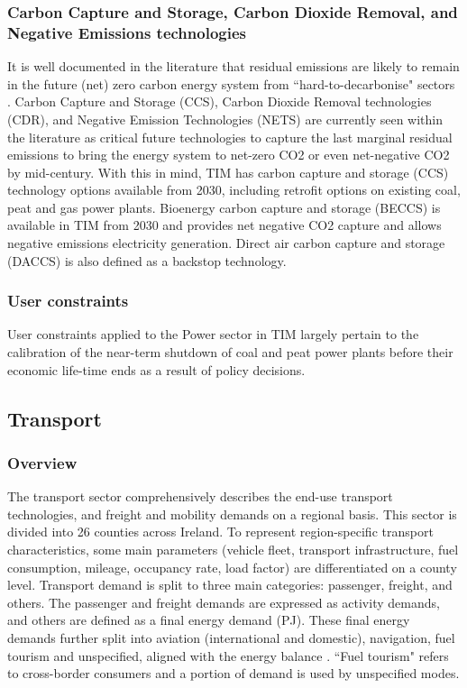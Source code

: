 \documentclass[gmd,manuscript]{copernicus}
\begin{document}
\subsubsection{Carbon Capture and Storage, Carbon Dioxide Removal, and Negative Emissions technologies}
It is well documented in the literature that residual emissions are likely to remain in the future (net) zero carbon energy system from ``hard-to-decarbonise" sectors \citep{Rogelj2018}. Carbon Capture and Storage (CCS), Carbon Dioxide Removal technologies (CDR), and Negative Emission Technologies (NETS) are currently seen within the literature as critical future technologies to capture the last marginal residual emissions to bring the energy system to net-zero CO2 or even net-negative CO2 by mid-century. With this in mind, TIM has carbon capture and storage (CCS) technology options available from 2030, including retrofit options on existing coal, peat and gas power plants. Bioenergy carbon capture and storage (BECCS) is available in TIM from 2030 and provides net negative CO2 capture and allows negative emissions electricity generation. Direct air carbon capture and storage (DACCS) is also defined as a backstop technology.

\subsubsection{User constraints}
User constraints applied to the Power sector in TIM largely pertain to the calibration of the near-term shutdown of coal and peat power plants before their economic life-time ends as a result of policy decisions. 

\subsection{Transport}
\label{ss:transport}

\subsubsection{Overview}
The transport sector comprehensively describes the end-use transport technologies, and freight and mobility demands on a regional basis. This sector is divided into 26 counties across Ireland. To represent region-specific transport characteristics, some main parameters (vehicle fleet, transport infrastructure, fuel consumption, mileage, occupancy rate, load factor) are differentiated on a county level. Transport demand is split to three main categories: passenger, freight, and others. The passenger and freight demands are expressed as activity demands, and others are defined as a final energy demand (PJ). These final energy demands further split into aviation (international and domestic), navigation, fuel tourism and unspecified, aligned with the energy balance \citep{SEAI2019}. ``Fuel tourism" refers to cross-border consumers and a portion of demand is used by unspecified modes. 
\end{document}
